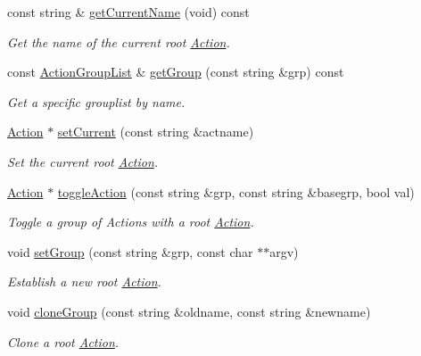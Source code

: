 \begin{DoxyCompactItemize}
const string \& \mbox{\hyperlink{class_action_database_ae68921ffe5175dad6b6b1f2e44c77d6b}{get\+Current\+Name}} (void) const
\begin{DoxyCompactList}\small\item\em Get the name of the current {\itshape root} \mbox{\hyperlink{class_action}{Action}}. \end{DoxyCompactList}\item 
const \mbox{\hyperlink{class_action_group_list}{Action\+Group\+List}} \& \mbox{\hyperlink{class_action_database_ad8f31b8112d7da028a3091e176151f14}{get\+Group}} (const string \&grp) const
\begin{DoxyCompactList}\small\item\em Get a specific grouplist by name. \end{DoxyCompactList}\item 
\mbox{\hyperlink{class_action}{Action}} $\ast$ \mbox{\hyperlink{class_action_database_a19e09431e4e66936090715ab8afe774b}{set\+Current}} (const string \&actname)
\begin{DoxyCompactList}\small\item\em Set the current {\itshape root} \mbox{\hyperlink{class_action}{Action}}. \end{DoxyCompactList}\item 
\mbox{\hyperlink{class_action}{Action}} $\ast$ \mbox{\hyperlink{class_action_database_a3b83440563e2eb689ab44c715679f41f}{toggle\+Action}} (const string \&grp, const string \&basegrp, bool val)
\begin{DoxyCompactList}\small\item\em Toggle a group of Actions with a {\itshape root} \mbox{\hyperlink{class_action}{Action}}. \end{DoxyCompactList}\item 
void \mbox{\hyperlink{class_action_database_adcd5e496a007d4d18456da556c755a42}{set\+Group}} (const string \&grp, const char $\ast$$\ast$argv)
\begin{DoxyCompactList}\small\item\em Establish a new {\itshape root} \mbox{\hyperlink{class_action}{Action}}. \end{DoxyCompactList}\item 
void \mbox{\hyperlink{class_action_database_a8a73393a21e7ae50bcdb138eab1dcaff}{clone\+Group}} (const string \&oldname, const string \&newname)
\begin{DoxyCompactList}\small\item\em Clone a {\itshape root} \mbox{\hyperlink{class_action}{Action}}. \end{DoxyCompactList}\item 
$$
\end{DoxyCompactItemize}

